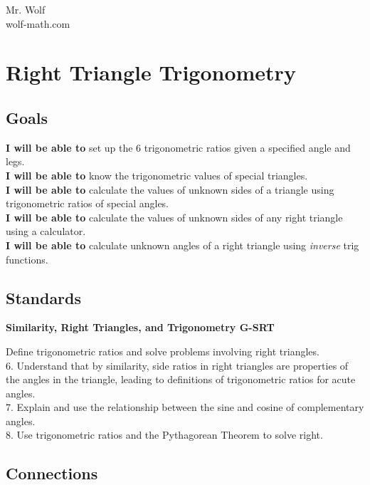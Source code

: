 \documentclass[12pt]{article}
\begin{document}
Mr. Wolf  \\ wolf-math.com

\section*{Right Triangle Trigonometry}

\subsection*{Goals}

\textbf{I will be able to} set up the 6 trigonometric ratios given a specified angle and legs.\\

\textbf{I will be able to} know the trigonometric values of special triangles.\\

\textbf{I will be able to} calculate the values of unknown sides of a triangle using trigonometric ratios of special angles.\\

\textbf{I will be able to} calculate the values of unknown sides of any right triangle using a calculator.\\

\textbf{I will be able to} calculate unknown angles of a right triangle using \textit{inverse} trig functions.

\subsection*{Standards}

\textbf{Similarity, Right Triangles, and Trigonometry \hfill G-SRT}

Define trigonometric ratios and solve problems involving right triangles.\\

6. Understand that by similarity, side ratios in right triangles are properties of the angles in the triangle, leading to definitions of trigonometric ratios for acute angles.\\

7. Explain and use the relationship between the sine and cosine of complementary angles.\\

8. Use trigonometric ratios and the Pythagorean Theorem to solve right.\\

\subsection*{Connections}
\end{document}
